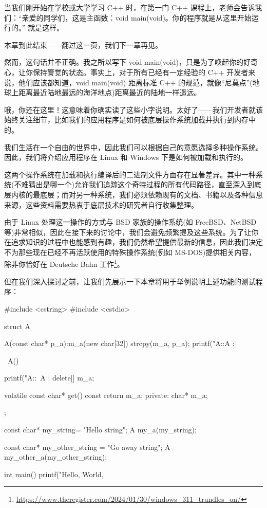 
当我们刚开始在学校或大学学习 C++ 时，在第一门 C++ 课程上，老师会告诉我们：“亲爱的同学们，这是主函数：void main(void)。你的程序就是从这里开始运行的。” 就是这样。

本章到此结束——翻过这一页，我们下一章再见。

然而，这句话并不正确。我之所以写下 void main(void)，只是为了唤起你的好奇心，让你保持警觉的状态。事实上，对于所有已经有一定经验的 C++ 开发者来说，他们应该都知道，void main(void) 距离标准 C++ 的规范，就像“尼莫点”(地球上距离最近陆地最远的海洋地点)距离最近的陆地一样遥远。

哦，你还在这里！这意味着你确实读了这些小字说明。太好了——我们开发者就该始终关注细节，比如我们的应用程序是如何被底层操作系统加载并执行到内存中的。

我们生活在一个自由的世界中，因此我们可以根据自己的意愿选择多种操作系统。因此，我们将介绍应用程序在 Linux 和 Windows 下是如何被加载和执行的。

这两个操作系统在加载和执行编译后的二进制文件方面存在显著差异。其中一种系统(不难猜出是哪一个)允许我们追踪这个奇特过程的所有代码路径，直至深入到底层内核的最底层；而对另一种系统，我们必须依赖现有的文档、书籍以及各种信息来源，这些资料需要热衷于底层技术的研究者自行收集整理。

由于 Linux 处理这一操作的方式与 BSD 家族的操作系统(如 FreeBSD、NetBSD 等)非常相似，因此在接下来的讨论中，我们会避免频繁提及这些系统。为了让你在追求知识的过程中也能感到有趣，我们仍然希望提供最新的信息，因此我们决定不为那些现在已经不再活跃使用的特殊操作系统(例如 MS-DOS)提供相关内容，除非你恰好在 Deutsche Bahn 工作\footnote{\url{https://www.theregister.com/2024/01/30/windows_311_trundles_on/}}。

但在我们深入探讨之前，让我们先展示一下本章将用于举例说明上述功能的测试程序：

\begin{cpp}
#include <cstring>
#include <cstdio>

struct A {
  A(const char* p_a):m_a(new char[32]) { strcpy(m_a, p_a);
    printf("A::A : %
  }

  ~A() {

  printf("A::~A : %
    delete[] m_a;
  }

  volatile const char* get() const {return m_a;}
private:
  char* m_a;
};

const char* my_string= "Hello string";
A my_a(my_string);

const char* my_other_string = "Go away string";
A my_other_a(my_other_string);

int main() {
  printf("Hello, World, %
}
\end{cpp}

